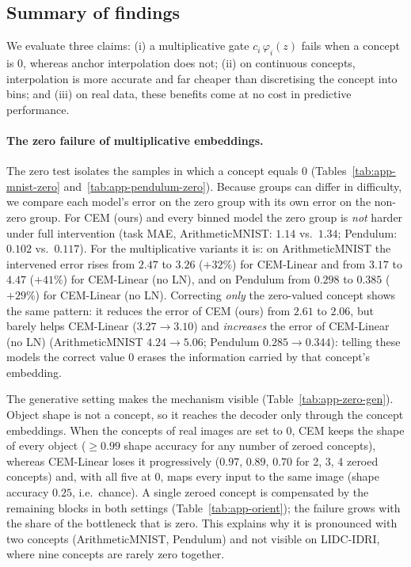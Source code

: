 
\subsection{Summary of findings}

We evaluate three claims: (i) a multiplicative gate $c_i\,\varphi_i(z)$ fails
when a concept is $0$, whereas anchor interpolation does not; (ii) on continuous
concepts, interpolation is more accurate and far cheaper than discretising the
concept into bins; and (iii) on real data, these benefits come at no cost in
predictive performance.

\paragraph{The zero failure of multiplicative embeddings.}
The zero test isolates the samples in which a concept equals $0$
(Tables~\ref{tab:app-mnist-zero} and~\ref{tab:app-pendulum-zero}). Because
groups can differ in difficulty, we compare each model's error on the zero
group with its own error on the non-zero group. For CEM (ours) and every binned
model the zero group is \emph{not} harder under full intervention
(task MAE, ArithmeticMNIST: $1.14$ vs.\ $1.34$; Pendulum: $0.102$ vs.\
$0.117$). For the multiplicative variants it is: on ArithmeticMNIST the
intervened error rises from $2.47$ to $3.26$ ($+32\%$) for CEM-Linear and from
$3.17$ to $4.47$ ($+41\%$) for CEM-Linear (no LN), and on Pendulum from $0.298$
to $0.385$ ($+29\%$) for CEM-Linear (no LN). Correcting \emph{only} the
zero-valued concept shows the same pattern: it reduces the error of CEM (ours)
from $2.61$ to $2.06$, but barely helps CEM-Linear ($3.27 \to 3.10$) and
\emph{increases} the error of CEM-Linear (no LN) (ArithmeticMNIST
$4.24 \to 5.06$; Pendulum $0.285 \to 0.344$): telling these models the correct
value $0$ erases the information carried by that concept's embedding.

The generative setting makes the mechanism visible
(Table~\ref{tab:app-zero-gen}). Object shape is not a concept, so it reaches the
decoder only through the concept embeddings. When the concepts of real images
are set to $0$, CEM keeps the shape of every object ($\geq 0.99$ shape accuracy
for any number of zeroed concepts), whereas CEM-Linear loses it progressively
($0.97$, $0.89$, $0.70$ for 2, 3, 4 zeroed concepts) and, with all five at $0$,
maps every input to the same image (shape accuracy $0.25$, i.e.\ chance).
A single zeroed concept is compensated by the remaining blocks in both settings
(Table~\ref{tab:app-orient}); the failure grows with the share of the
bottleneck that is zero. This explains why it is pronounced with two concepts
(ArithmeticMNIST, Pendulum) and not visible on LIDC-IDRI, where nine concepts
are rarely zero together.

